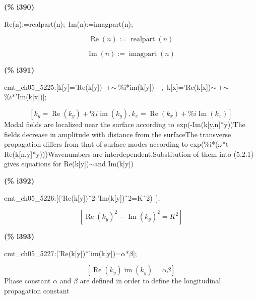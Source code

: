 \documentclass[fleqn]{article}
\begin{document}
\noindent
\begin{minipage}[t]{4.000000em}\color{red}\bfseries
(\% i390)	
\end{minipage}
\begin{minipage}[t]{\textwidth}\color{blue}
Re(n):=realpart(n);\ Im(n):=imagpart(n);
\end{minipage}
\[\displaystyle \tag{\% o389} 
\operatorname{Re}(n)\operatorname{:=}\operatorname{realpart}(n)\mbox{}\]

\[\tag{\% o390} 
\operatorname{Im}(n)\operatorname{:=}\operatorname{imagpart}(n)\mbox{}
\]


\noindent
\begin{minipage}[t]{4.000000em}\color{red}\bfseries
(\% i391)	
\end{minipage}
\begin{minipage}[t]{\textwidth}\color{blue}
cmt\_ch05\_5225:[k[y]='Re(k[y])\ +\ensuremath{\sim\ }\%i*im(k[y])\ \ ,\ k[x]='Re(k[x])\ensuremath{\sim\ }+\ensuremath{\sim\ }\%i*'Im(k[x])];
\end{minipage}
\[\displaystyle \tag{\% o391} 
\left[ {k_y}=\operatorname{Re}\left( {k_y}\right) +\% i \operatorname{im}\left( {k_y}\right) \operatorname{,}{k_x}=\operatorname{Re}\left( {k_x}\right) +\% i \operatorname{Im}\left( {k_x}\right) \right] \mbox{}
\]
Modal fields are localized near the surface according to exp(-Im(k[y,n]*y))The fields decrease in amplitude with distance from the surfaceThe transverse propagation differs from that of surface modes according to exp(\%i*(\ensuremath{\omega}*t-Re(k[n,y]*y)))Wavenumbers are interdependent.Substitution of them into (5.2.1) gives equations for Re(k[y])\ensuremath{\sim }and Im(k[y])


\noindent
\begin{minipage}[t]{4.000000em}\color{red}\bfseries
(\% i392)	
\end{minipage}
\begin{minipage}[t]{\textwidth}\color{blue}
cmt\_ch05\_5226:[('Re(k[y])\^\ 2-'Im(k[y])\^\ 2=K\^\ 2)\ ];
\end{minipage}
\[\displaystyle \tag{\% o392} 
\left[ {{\operatorname{Re}\left( {k_y}\right) }^{2}}-{{\operatorname{Im}\left( {k_y}\right) }^{2}}={{K}^{2}}\right] \mbox{}
\]


\noindent
\begin{minipage}[t]{4.000000em}\color{red}\bfseries
(\% i393)	
\end{minipage}
\begin{minipage}[t]{\textwidth}\color{blue}
cmt\_ch05\_5227:['Re(k[y])*'im(k[y])=\ensuremath{\alpha}*\ensuremath{\beta}];
\end{minipage}
\[\displaystyle \tag{\% o393} 
\left[ \operatorname{Re}\left( {k_y}\right)  \operatorname{im}\left( {k_y}\right) =\alpha  \beta \right] \mbox{}
\]
Phase constant \ensuremath{\alpha} and \ensuremath{\beta} are defined in order to define the longitudinal propagation constant
\end{document}
